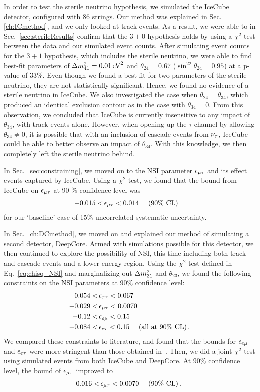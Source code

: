 In order to test the sterile neutrino hypothesis, we simulated the IceCube detector, configured with 86 strings. Our method was explained in Sec.\ref{ch:ICmethod}, and we only looked at track events. 
As a result, we were able to in Sec.~\ref{sec:sterileResults} confirm that the $3+0$ hypothesis holds by using a $\chi^2$ test between the data and our simulated event counts. %
After simulating event counts for the $3+1$ hypothesis, which includes the sterile neutrino, we were able to find best-fit parameters of 
$\dm[41] = \SI{0.01}{\eV^2}$ and $\theta_{24} = 0.67$ ($\sin^22\theta_{24} = 0.95$) at 
a p-value of $33\%$. Even though we found a best-fit for two parameters of the sterile neutrino, they are not statistically significant. Hence, we found no evidence of a sterile neutrino in IceCube.
We also investigated the case when $\theta_{24} = \theta_{34}$, which produced an identical exclusion contour as in the case with $\theta_{34}=0$. From this observation, 
we concluded that IceCube is currently insensitive to any impact of $\theta_{34}$, with track events alone. However,
when opening up the $\tau$ channel by allowing $\theta_{34} \neq 0$, it is possible that with an inclusion of cascade events from $\nu_\tau$, IceCube could be able to better observe 
an impact of $\theta_{34}$. With this knowledge, we then completely left the sterile neutrino behind.

In Sec.~\ref{sec:constraining}, we moved on to the NSI parameter $\epsilon_{\mu\tau}$ and its effect events captured by IceCube. 
Using a $\chi^2$ test, we found that the bound from IceCube on $\epsilon_{\mu\tau}$ at 90 \% confidence level was 
\begin{align}
    -0.015 <\,& \epsilon_{\mu\tau} < 0.014\ \quad (90\% \text{ CL})
\end{align}
for our `baseline' case of 15\% uncorrelated systematic uncertainty.

In Sec.~\ref{ch:DCmethod}, we moved on and explained our method of simulating a second detector, DeepCore. Armed with simulations possible for this detector, we then continued to explore the possibility of NSI, this time including both track and cascade events and a lower energy region.
Using the $\chi^2$ test defined in Eq.~\ref{eq:chisq_NSI} and marginalizing out $\dm[31]$ and $\theta_{23}$, we found the following constraints on the NSI parameters at 90\% confidence level:
\begin{align}
    -0.054 <&\, \epsilon_{\tau\tau} < 0.067 \nonumber \\
    -0.029 <&\, \epsilon_{\mu\tau} < 0.0070 \nonumber \\
    -0.12 <&\, \epsilon_{e\mu} < 0.15 \nonumber \\
    -0.084 <&\, \epsilon_{e\tau} < 0.15\ \quad (\text{all at }90\% \text{ CL})\,.
 \end{align}
We compared these constraints to literature, and found that the bounds for $\epsilon_{e\mu}$ and $\epsilon_{e\tau}$ were more stringent than those obtained in~\cite{demidov}.
Then, we did a joint $\chi^2$ test using simulated events from both IceCube and DeepCore. At 90\% confidence level, the bound of $\epsilon_{\mu\tau}$ improved to
\begin{align}
    -0.016 <&\, \epsilon_{\mu\tau} < 0.0070\ \quad (90\% \text{ CL})\,.
 \end{align}

